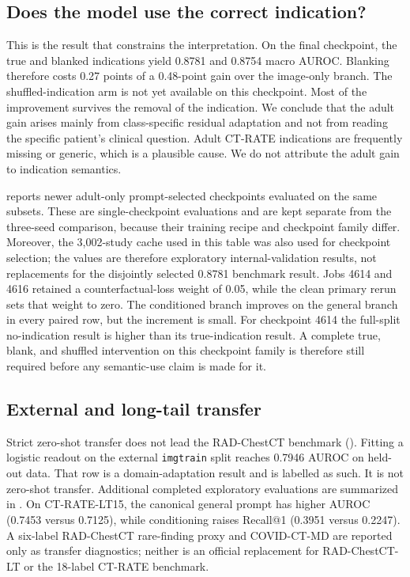 \documentclass[10pt,twocolumn]{article}
\begin{document}
\subsection{Does the model use the correct indication?}
This is the result that constrains the interpretation. On the final
checkpoint, the true and blanked indications yield 0.8781 and 0.8754 macro
AUROC. Blanking therefore costs 0.27 points of a 0.48-point gain over the
image-only branch. The shuffled-indication arm is not yet available on this
checkpoint. Most of the improvement survives the removal of the
indication. We conclude that the adult gain arises mainly from
class-specific residual adaptation and not from reading the specific patient's
clinical question. Adult CT-RATE indications are frequently missing or
generic, which is a plausible cause. We do not attribute the adult gain to
indication semantics.

 reports newer adult-only prompt-selected checkpoints
evaluated on the same subsets. These are single-checkpoint evaluations and are
kept separate from the three-seed comparison, because their training recipe
and checkpoint family differ. Moreover, the 3,002-study cache used in this
table was also used for checkpoint selection; the values are therefore
exploratory internal-validation results, not replacements for the disjointly
selected 0.8781 benchmark result. Jobs 4614 and 4616 retained a counterfactual-loss
weight of 0.05, while the clean primary rerun sets that weight to zero. The
conditioned branch improves on the general branch in every paired row, but the
increment is small. For checkpoint 4614 the full-split no-indication result is
higher than its true-indication result. A complete true, blank, and shuffled
intervention on this checkpoint family is therefore still required before any
semantic-use claim is made for it.

\subsection{External and long-tail transfer}
Strict zero-shot transfer does not lead the RAD-ChestCT benchmark
(). Fitting a logistic readout on the external
\texttt{imgtrain} split reaches 0.7946 AUROC on held-out data. That row is a
domain-adaptation result and is labelled as such. It is not zero-shot
transfer. Additional completed exploratory evaluations are summarized in
. On CT-RATE-LT15, the canonical general prompt has higher
AUROC (0.7453 versus 0.7125), while conditioning raises Recall@1 (0.3951 versus
0.2247). A six-label RAD-ChestCT rare-finding proxy and COVID-CT-MD are
reported only as transfer diagnostics; neither is an official replacement for
RAD-ChestCT-LT or the 18-label CT-RATE benchmark.
\end{document}
